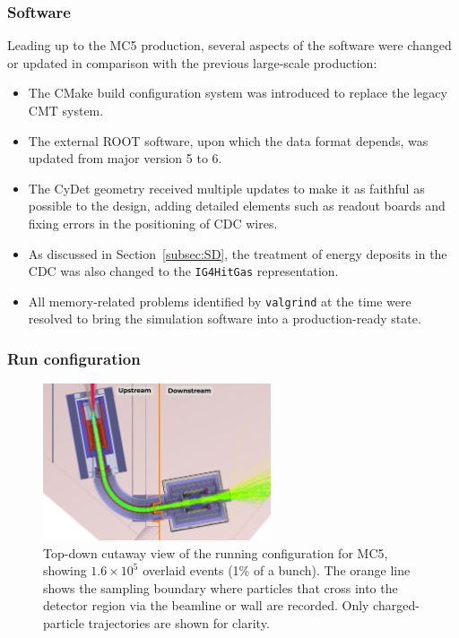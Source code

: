 \subsubsection{Software}
Leading up to the MC5 production, several aspects of the software were changed or updated in comparison with the previous large-scale production:
\begin{itemize}
    \item The CMake build configuration system was introduced to replace the legacy CMT system. 
    \item The external ROOT software, upon which the \oaEvent data format depends, was updated from major version 5 to 6.
    \item The CyDet geometry received multiple updates to make it as faithful as possible to the design, adding detailed elements such as readout boards and fixing errors in the positioning of CDC wires. 
    \item As discussed in Section~\ref{subsec:SD}, the treatment of energy deposits in the CDC was also changed to the \texttt{IG4HitGas} representation.
    \item All memory-related problems identified by \texttt{valgrind} at the time were resolved to bring the simulation software into a production-ready state.
\end{itemize}

\subsubsection{Run configuration}

\begin{figure}
    \centering
    \includegraphics[width=0.6\textwidth]{chapter3/sampling_plane_illu_ink.pdf}
    \caption{
        Top-down cutaway view of the running configuration for MC5,
        showing $1.6\times 10^5$ overlaid events (1\% of a bunch). The orange
        line shows the sampling boundary where particles that cross into the
        detector region via the beamline or wall are recorded. Only
        charged-particle trajectories are shown for clarity.
    }
    \label{fig:Phase-I Sampling World}
\end{figure}



